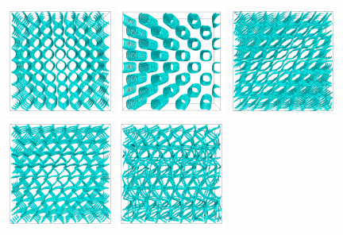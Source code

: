 \documentclass[aps,pre,reprint,superscriptaddress, twocolumn]{revtex4}
\begin{document}
\begin{figure}[htpb]
\includegraphics[width=0.32\textwidth]{disc-xy-400k_run1115.png}
\includegraphics[width=0.32\textwidth]{disc-yz-400k_run1115.png}
\includegraphics[width=0.32\textwidth]{disc-xy-700k_run1115.png}\\
\includegraphics[width=0.32\textwidth]{disc-xy-750k_run1115.png}
\includegraphics[width=0.32\textwidth]{disc-xy-1700k_run1115.png}

\end{figure}
\end{document}
